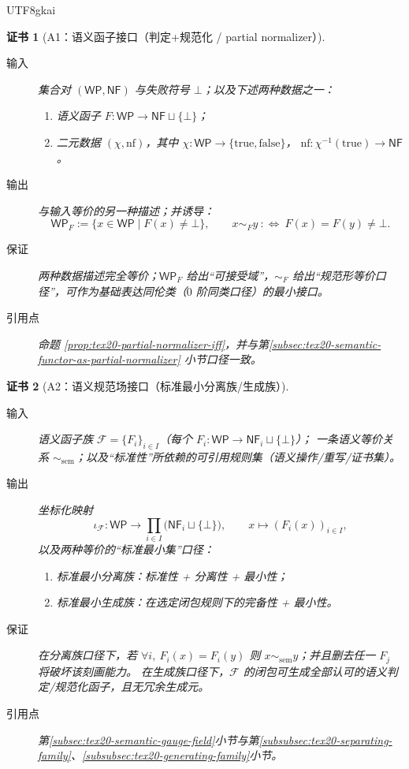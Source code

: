 \documentclass[12pt]{article}
\newtheorem{Certificate}{证书}[section]
\begin{document}
\begin{CJK*}{UTF8}{gkai}
\begin{Certificate}[A1：语义函子接口（判定+规范化 / partial normalizer）]
\label{cert:tex20-appA-semantic-functor-interface}
\begin{description}
  \item[输入] 集合对 $(\mathsf{WP},\mathsf{NF})$ 与失败符号 $\bot$；以及下述两种数据之一：
  \begin{enumerate}
    \item 语义函子 $F:\mathsf{WP}\to \mathsf{NF}\sqcup\{\bot\}$；
    \item 二元数据 $(\chi,\mathrm{nf})$，其中
    $\chi:\mathsf{WP}\to\{\mathrm{true},\mathrm{false}\}$，
    $\mathrm{nf}:\chi^{-1}(\mathrm{true})\to\mathsf{NF}$。
  \end{enumerate}
  \item[输出] 与输入等价的另一种描述；并诱导：
  \[
  \mathsf{WP}_F:=\{x\in\mathsf{WP}\mid F(x)\neq\bot\},
  \qquad
  x\sim_F y\ :\Longleftrightarrow\ F(x)=F(y)\neq\bot.
  \]
  \item[保证] 两种数据描述完全等价；$\mathsf{WP}_F$ 给出“可接受域”，$\sim_F$ 给出“规范形等价口径”，可作为基础表达同伦类（$0$ 阶同类口径）的最小接口。
  \item[引用点] 命题 \ref{prop:tex20-partial-normalizer-iff}，并与第\ref{subsec:tex20-semantic-functor-as-partial-normalizer}
    小节口径一致。
\end{description}
\end{Certificate}

\begin{Certificate}[A2：语义规范场接口（标准最小分离族/生成族）]
\label{cert:tex20-appA-semantic-gauge-field-interface}
\begin{description}
  \item[输入] 语义函子族 $\mathcal{F}=\{F_i\}_{i\in I}$（每个 $F_i:\mathsf{WP}\to\mathsf{NF}_i\sqcup\{\bot\}$）；
  一条语义等价关系 $\sim_{\mathrm{sem}}$；以及“标准性”所依赖的可引用规则集（语义操作/重写/证书集）。
  \item[输出] 坐标化映射
  \[
  \iota_{\mathcal{F}}:\mathsf{WP}\to \prod_{i\in I}\bigl(\mathsf{NF}_i\sqcup\{\bot\}\bigr),
  \qquad
  x\mapsto (F_i(x))_{i\in I},
  \]
  以及两种等价的“标准最小集”口径：
  \begin{enumerate}
    \item 标准最小\emph{分离族}：标准性 + 分离性 + 最小性；
    \item 标准最小\emph{生成族}：在选定闭包规则下的完备性 + 最小性。
  \end{enumerate}
  \item[保证] 在分离族口径下，若 $\forall i,\ F_i(x)=F_i(y)$ 则 $x\sim_{\mathrm{sem}} y$；并且删去任一 $F_j$ 将破坏该刻画能力。
  在生成族口径下，$\mathcal{F}$ 的闭包可生成全部认可的语义判定/规范化函子，且无冗余生成元。
  \item[引用点] 第\ref{subsec:tex20-semantic-gauge-field}小节与第\ref{subsubsec:tex20-separating-family}、\ref{subsubsec:tex20-generating-family}小节。
\end{description}
\end{Certificate}


\end{CJK*}
\end{document}
